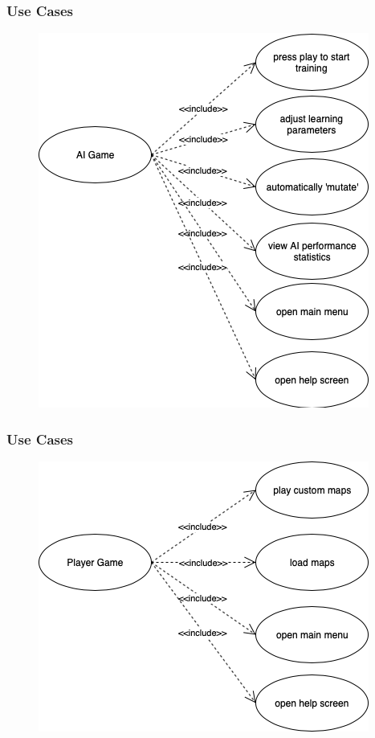 \documentclass{beamer}
\begin{document}
\begin{frame}
    \frametitle{Use Cases}
    \begin{figure}
        \includegraphics[scale=0.37]{resources/Use_Case_AI_Game.png}

    \end{figure}

\end{frame}


\begin{frame}
    \frametitle{Use Cases}
    \begin{figure}
        \includegraphics[scale=0.5]{resources/Use_Case_Player_Game.png}

    \end{figure}

\end{frame}
\end{document}
